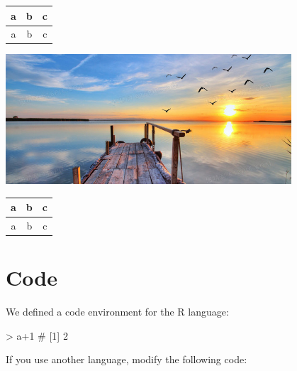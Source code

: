 \documentclass[11pt,a4paper]{article}
\begin{document}
\begin{tex}
    \begin{center}
        \begin{tabular}{|c|c|c|}
            \hline
            a & b & c \\
            \hline
            a & b & c \\
            \hline
        \end{tabular}
    \end{center}
\end{tex}

\begin{bluebox}
    \begin{center}
        \includegraphics[width=0.8\textwidth]{image.jpeg}
    \end{center}
    \begin{center}
        \begin{tabular}{|c|c|c|}
            \hline
            a & b & c \\
            \hline
            a & b & c \\
            \hline
        \end{tabular}
    \end{center}
\end{bluebox}




\section{Code}
{\color{blue}We defined a code environment for the R language:}

\begin{R}
> a+1
# [1] 2
\end{R}

{\color{blue}If you use another language, modify the following code:}
\end{document}
